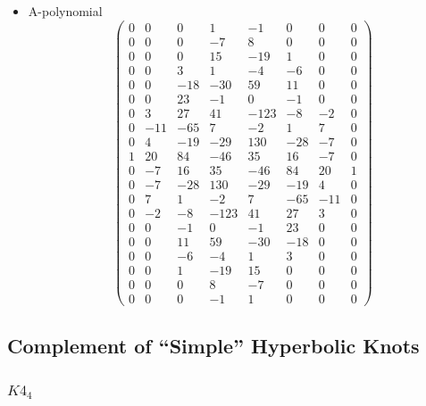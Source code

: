 \documentclass[12pt,reqno]{amsart}
\numberwithin{equation}{section}
\begin{document}
\begin{itemize}
\item A-polynomial
  \begin{equation*}
    \begin{pmatrix}
      0 & 0 & 0 & 1 & -1 & 0 & 0 & 0  \\
      0 & 0 & 0 & -7 & 8 & 0 & 0 & 0  \\
      0 & 0 & 0 & 15 & -19 & 1 & 0 & 0  \\
      0 & 0 & 3 & 1 & -4 & -6 & 0 & 0  \\
      0 & 0 & -18 & -30 & 59 & 11 & 0 & 0  \\
      0 & 0 & 23 & -1 & 0 & -1 & 0 & 0  \\
      0 & 3 & 27 & 41 & -123 & -8 & -2 & 0  \\
      0 & -11 & -65 & 7 & -2 & 1 & 7 & 0  \\
      0 & 4 & -19 & -29 & 130 & -28 & -7 & 0  \\
      1 & 20 & 84 & -46 & 35 & 16 & -7 & 0  \\
      0 & -7 & 16 & 35 & -46 & 84 & 20 & 1  \\
      0 & -7 & -28 & 130 & -29 & -19 & 4 & 0  \\
      0 & 7 & 1 & -2 & 7 & -65 & -11 & 0  \\
      0 & -2 & -8 & -123 & 41 & 27 & 3 & 0  \\
      0 & 0 & -1 & 0 & -1 & 23 & 0 & 0  \\
      0 & 0 & 11 & 59 & -30 & -18 & 0 & 0  \\
      0 & 0 & -6 & -4 & 1 & 3 & 0 & 0  \\
      0 & 0 & 1 & -19 & 15 & 0 & 0 & 0  \\
      0 & 0 & 0 & 8 & -7 & 0 & 0 & 0  \\
      0 & 0 & 0 & -1 & 1 & 0 & 0 & 0  
    \end{pmatrix}
  \end{equation*}
\end{itemize}

\subsection{Complement of ``Simple'' Hyperbolic Knots}
\label{sec:second_appendix}

\subsubsection{%
  $K4_{4}$}
\end{document}
